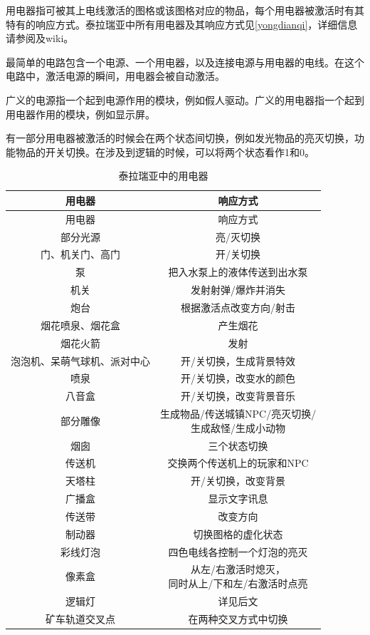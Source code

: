 用电器指可被其上电线激活的图格或该图格对应的物品，每个用电器被激活时有其特有的响应方式。泰拉瑞亚中所有用电器及其响应方式见\autoref{yongdianqi}，详细信息请参阅及wiki。

最简单的电路包含一个电源、一个用电器，以及连接电源与用电器的电线。在这个电路中，激活电源的瞬间，用电器会被自动激活。

广义的电源指一个起到电源作用的模块，例如假人驱动。广义的用电器指一个起到用电器作用的模块，例如显示屏。

有一部分用电器被激活的时候会在两个状态间切换，例如发光物品的亮灭切换，功能物品的开关切换。在涉及到逻辑的时候，可以将两个状态看作1和0。

\begin{longtable}{|c|c|}
\caption{泰拉瑞亚中的用电器}\label{yongdianqi}\\\hline
用电器		&	响应方式	\\\hline
\endfirsthead
\hline
用电器		&	响应方式	\\\hline
\endhead
\hline
\endfoot
部分光源	&	亮/灭切换	\\\hline
门、机关门、高门&	开/关切换	\\\hline
泵	&把入水泵上的液体传送到出水泵	\\\hline
机关	&	发射射弹/爆炸并消失	\\\hline
炮台&根据激活点改变方向/射击\\\hline
烟花喷泉、烟花盒&产生烟花\\\hline
烟花火箭&发射\\\hline
泡泡机、呆萌气球机、派对中心&开/关切换，生成背景特效\\\hline
喷泉&开/关切换，改变水的颜色\\\hline
八音盒&开/关切换，改变背景音乐\\\hline
部分雕像&\makecell{生成物品/传送城镇NPC/亮灭切换/\\生成敌怪/生成小动物}\\\hline
烟囱&三个状态切换\\\hline
传送机&交换两个传送机上的玩家和NPC\\\hline
天塔柱&开/关切换，改变背景\\\hline
广播盒&显示文字讯息\\\hline
传送带&改变方向\\\hline
制动器&切换图格的虚化状态\\\hline
彩线灯泡&四色电线各控制一个灯泡的亮灭\\\hline
像素盒&\makecell{从左/右激活时熄灭，\\同时从上/下和左/右激活时点亮}\\\hline
逻辑灯&详见后文\\\hline
矿车轨道交叉点&在两种交叉方式中切换
\end{longtable}

